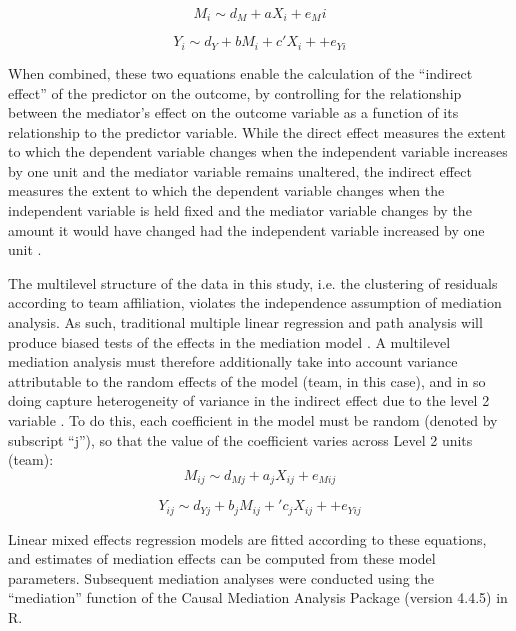 \begin{CJK}{UTF8}{gbsn}
\begin{equation}
  M_i \sim d_M + aX_i + e_Mi
\end{equation}

\begin{equation}
  Y_i \sim d_Y + bM_i + c'X_i +  + e_{Yi}
\end{equation}
\bigskip

When combined, these two equations enable the calculation of the ``indirect effect'' of the predictor on the outcome, by controlling for the relationship between the mediator's effect on the outcome variable as a function of its relationship to the predictor variable.  While the direct effect measures the extent to which the dependent variable changes when the independent variable increases by one unit and the mediator variable remains unaltered, the indirect effect measures the extent to which the dependent variable changes when the independent variable is held fixed and the mediator variable changes by the amount it would have changed had the independent variable increased by one unit \citep{Bauer2006}.

The multilevel structure of the data in this study, i.e. the clustering of residuals according to team affiliation, violates the independence assumption of mediation analysis. As such, traditional multiple linear regression and path analysis will produce biased tests of the effects in the mediation model \citep{Raudenbush2002}.
A multilevel mediation analysis must therefore additionally take into account variance attributable to the random effects of the model (team, in this case), and in so doing capture heterogeneity of variance in the indirect effect due to the level 2 variable \citep{Tofighi2014}.  To do this, each coefficient in the model must be random (denoted by subscript ``j''), so that the value of the coefficient varies across Level 2 units (team): \\

\begin{equation}
  M_{ij} \sim d_{Mj} + a_jX_{ij} + e_{Mij}
\end{equation}

\begin{equation}
  Y_{ij} \sim d_{Yj} + b_jM_{ij} + 'c_jX_{ij} +  + e_{Yij}
\end{equation}
\bigskip

Linear mixed effects regression models are fitted according to these equations, and estimates of mediation effects can be computed from these model parameters.  Subsequent mediation analyses were conducted using the ``mediation'' function of the Causal Mediation Analysis Package (version 4.4.5) in R.










\end{CJK}
